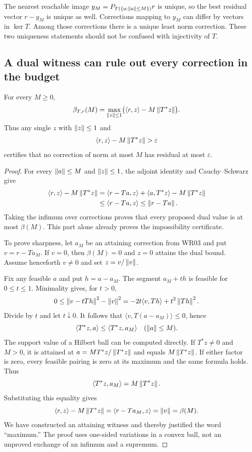 The nearest reachable image $y_M=P_{T(\{a:\left\lVert a\right\rVert\le M\})}r$ is unique, so the best residual vector $r-y_M$ is unique as well. Corrections mapping to $y_M$ can differ by vectors in $\ker T$. Among those corrections there is a unique least norm correction. These two uniqueness statements should not be confused with injectivity of $T$.

\subsection{A dual witness can rule out every correction in the budget}
\begin{theorem}\label{WR04}
For every $M\ge0$,
\begin{equation}\label{eq:budget-dual}
 \beta_{T,r}(M)=
 \max_{\left\lVert z\right\rVert\le1}\bigl(\langle r,z\rangle-M\left\lVert T^*z\right\rVert\bigr).
\end{equation}
Thus any single $z$ with $\left\lVert z\right\rVert\le1$ and
\[
 \langle r,z\rangle-M\left\lVert T^*z\right\rVert>\varepsilon
\]
certifies that no correction of norm at most $M$ has residual at most $\varepsilon$.
\end{theorem}
\begin{proof}
For every $\left\lVert a\right\rVert\le M$ and $\left\lVert z\right\rVert\le1$, the adjoint identity and Cauchy--Schwarz give
\[
\begin{aligned}
 \langle r,z\rangle-M\left\lVert T^*z\right\rVert
 &=\langle r-Ta,z\rangle+\langle a,T^*z\rangle-M\left\lVert T^*z\right\rVert\\
 &\le\langle r-Ta,z\rangle
 \le\left\lVert r-Ta\right\rVert.
\end{aligned}
\]
Taking the infimum over corrections proves that every proposed dual value is at most $\beta(M)$. This part alone already proves the impossibility certificate.

To prove sharpness, let $a_M$ be an attaining correction from WR03 and put $v=r-Ta_M$. If $v=0$, then $\beta(M)=0$ and $z=0$ attains the dual bound. Assume henceforth $v\ne0$ and set $z=v/\left\lVert v\right\rVert$.

Fix any feasible $a$ and put $h=a-a_M$. The segment $a_M+th$ is feasible for $0\le t\le1$. Minimality gives, for $t>0$,
\[
 0\le\left\lVert v-tTh\right\rVert^2-\left\lVert v\right\rVert^2
   =-2t\langle v,Th\rangle+t^2\left\lVert Th\right\rVert^2.
\]
Divide by $t$ and let $t\downarrow0$. It follows that $\langle v,T(a-a_M)\rangle\le0$, hence
\[
 \langle T^*z,a\rangle\le\langle T^*z,a_M\rangle
 \quad(\left\lVert a\right\rVert\le M).
\]
The support value of a Hilbert ball can be computed directly. If $T^*z\ne0$ and $M>0$, it is attained at $a=M T^*z/\left\lVert T^*z\right\rVert$ and equals $M\left\lVert T^*z\right\rVert$. If either factor is zero, every feasible pairing is zero at its maximum and the same formula holds. Thus
\[
 \langle T^*z,a_M\rangle=M\left\lVert T^*z\right\rVert.
\]
Substituting this equality gives
\[
 \langle r,z\rangle-M\left\lVert T^*z\right\rVert
 =\langle r-Ta_M,z\rangle=\left\lVert v\right\rVert=\beta(M).
\]
We have constructed an attaining witness and thereby justified the word ``maximum.'' The proof uses one-sided variations in a convex ball, not an unproved exchange of an infimum and a supremum.
\end{proof}

